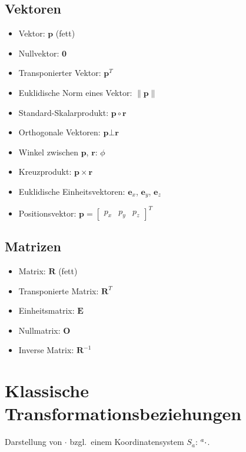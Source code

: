 \documentclass[a4paper, 11pt, accentcolor = tud3b]{tudreport}
\newcommand{\inreferenceto}[2]{\prescript{#1}{}{#2}}
\newcommand{\mat}[1]{\boldsymbol{#1}}
\renewcommand{\vec}[1]{\boldsymbol{\mathbf{#1}}}
\newcommand{\bzgl}{bzgl.~}
\begin{document}
			\subsection{Vektoren}
				\begin{itemize}
					\item Vektor:                        \tabto{5.5cm} \( \vec{p} \) (fett)
					\item Nullvektor:                    \tabto{5.5cm} \( \vec{0} \)
					\item Transponierter Vektor:         \tabto{5.5cm} \( \vec{p}^T  \)
					\item Euklidische Norm eines Vektor: \tabto{5.5cm} \( \lVert \vec{p} \rVert \)
					\item Standard-Skalarprodukt:        \tabto{5.5cm} \( \vec{p} \circ \vec{r} \)
					\item Orthogonale Vektoren:          \tabto{5.5cm} \( \vec{p} \bot \vec{r} \)
					\item Winkel zwischen                \tabto{5.5cm} \(\vec{p}\), \(\vec{r}\): \( \phi \)
					\item Kreuzprodukt:                  \tabto{5.5cm} \( \vec{p} \times \vec{r} \)
					\item Euklidische Einheitsvektoren:  \tabto{5.5cm} \( \vec{e}_x \), \( \vec{e}_y \), \( \vec{e}_z \)
					\item Positionsvektor:               \tabto{5.5cm} \( \vec{p} = \begin{bmatrix} p_x & p_y & p_z \end{bmatrix}^T \)
				\end{itemize}

			\subsection{Matrizen}
				\begin{itemize}
					\item Matrix:               \tabto{4cm} \( \mat{R} \) (fett)
					\item Transponierte Matrix: \tabto{4cm} \( \mat{R}^T \)
					\item Einheitsmatrix:       \tabto{4cm} \( \mat{E} \)
					\item Nullmatrix:           \tabto{4cm} \( \mat{O} \)
					\item Inverse Matrix:       \tabto{4cm} \( \mat{R}^{-1} \)
				\end{itemize}

		\section{Klassische Transformationsbeziehungen}
			Darstellung von \( \cdot \) \bzgl einem Koordinatensystem \( S_a \): \( \inreferenceto{a}{\cdot} \).
			
\end{document}
